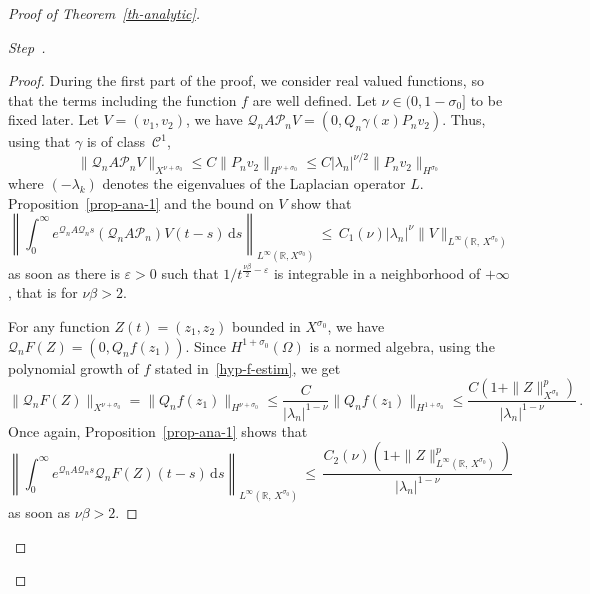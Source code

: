 \documentclass[10pt]{amsart}
\theoremstyle{definition}\newtheorem{defi}[theo]{Definition}\newtheorem{rema}[theo]{Remark}\newtheorem{exam}[theo]{Example}\newtheorem{exem}[theo]{Example}\newtheorem{nota}[theo]{Notation}
\newcommand{\RR}{\mathbb{R}}
\newcommand{\Cc}{\mathcal{C}}
\newcommand{\Pc}{\mathcal{P}}
\newcommand{\Qc}{\mathcal{Q}}
\newcommand{\drm}{\mathrm{d}}
\newcounter{stepcount}
\newenvironment{step}{\refstepcounter{stepcount}\begin{proof}[Step~\thestepcount]}{\let\qed\relax\end{proof}}
\begin{document}
\begin{proof}[{Proof of Theorem~\ref{th-analytic}}]
\begin{step}
\begin{proof}
During the first part of the proof, we consider real valued functions, so that the terms including the function $f$ are well defined. Let $\nu\in (0,1-\sigma_0]$ to be fixed later. Let $V=(v_1,v_2)$, we have $\Qc_n A\Pc_n V= (0,Q_n\gamma(x)P_n v_2)$. Thus, using that $\gamma$ is of class~$\Cc^1$,
\[
\|\Qc_n A \Pc_n V\|_{X^{\nu+\sigma_0}} \leq C \|P_n
v_2\|_{H^{\nu+\sigma_0}} \leq C |\lambda_n|^{\nu/2}\|P_n
v_2\|_{H^{\sigma_0}}
\]
where $(-\lambda_k)$ denotes the eigenvalues of the Laplacian operator $L$. Proposition~\ref{prop-ana-1} and the bound on $V$ show that
\begin{equation}\label{eq-demo-prop-W-1}
\left\| \int_0^\infty e^{\Qc_n A\Qc_n s}(\Qc_nA\Pc_n) V(t-s)\,\drm s\right\|_{L^\infty(\RR,X^{\sigma_0})}\,\leq\,C_1(\nu)|\lambda_n|^{\nu}\|V\|_{L^\infty(\RR,\,X^{\sigma_0})}
\end{equation}
as soon as there is $\varepsilon>0$ such that $1/t^{\frac{\nu\beta}{2}-\varepsilon}$ is integrable in a neighborhood of $+\infty$, that is for $\nu\beta>2$.

For any function $Z(t)=(z_1,z_2)$ bounded in $X^{\sigma_0}$, we have $\Qc_n F(Z)=(0,Q_n f(z_1))$. Since $H^{1+\sigma_0}(\Omega)$ is a normed algebra, using the polynomial growth of $f$ stated in~\eqref{hyp-f-estim}, we get
\[
\|\Qc_n F(Z)\|_{X^{\nu+\sigma_0}} = \|Q_n
f(z_1)\|_{H^{\nu+\sigma_0}}\leq \frac C {|\lambda_n|^{1-\nu}}
\|Q_n f(z_1)\|_{H^{1+\sigma_0}}\leq
\frac{C\left(1+\|Z\|_{X^{\sigma_0}}^p\right)}{|\lambda_n|^{1-\nu}}\,.
\]
Once again, Proposition~\ref{prop-ana-1} shows that
\begin{equation}\label{eq-demo-prop-W-2}
\left\| \int_0^\infty e^{\Qc_n A\Qc_n s}\Qc_n F(Z)(t-s)\,\drm s \right\|_{ L^\infty(\RR,\, X^{\sigma_0})}\,\leq\,\frac{C_2(\nu)\left(1+\|Z\|_{L^\infty(\RR,\,X^{\sigma_0}) }^p\right) } {|\lambda_n|^{ 1-\nu}}
\end{equation}
as soon as $\nu\beta>2$.


\end{proof}
\end{step}
\end{proof}
\end{document}
